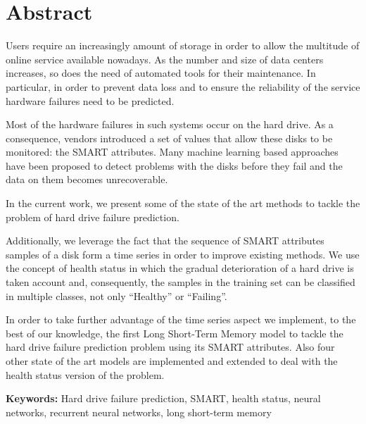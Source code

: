 \chapter*{Abstract}

Users require an increasingly amount of storage in order to allow the multitude of online service available nowadays.
As the number and size of data centers increases, so does the need of automated tools for their maintenance.
In particular, in order to prevent data loss and to ensure the reliability of the service hardware failures need to be predicted.

Most of the hardware failures in such systems occur on the hard drive.
As a consequence, vendors introduced a set of values that allow these disks to be monitored: the SMART attributes.
Many machine learning based approaches have been proposed to detect problems with the disks before they fail and the data on them becomes unrecoverable.

In the current work, we present some of the state of the art methods to tackle the problem of hard drive failure prediction.

Additionally, we leverage the fact that the sequence of SMART attributes samples of a disk form a time series in order to improve existing methods.
We use the concept of health status in which the gradual deterioration of a hard drive is taken account and, consequently, the samples in the training set can be classified in multiple classes, not only ``Healthy'' or ``Failing''.

In order to take further advantage of the time series aspect we implement, to the best of our knowledge, the first Long Short-Term Memory model to tackle the hard drive failure prediction problem using its SMART attributes.
Also four other state of the art models are implemented and extended to deal with the health status version of the problem.


\textbf{Keywords:} Hard drive failure prediction, SMART, health status, neural networks, recurrent neural networks, long short-term memory 